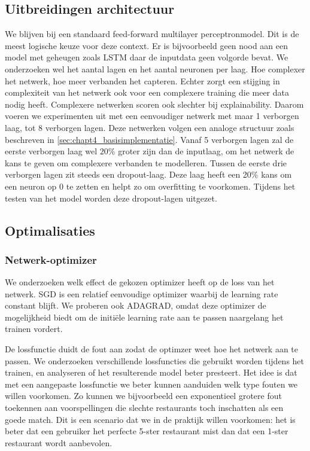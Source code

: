 \subsection{Uitbreidingen architectuur}
We blijven bij een standaard feed-forward multilayer perceptronmodel. Dit is de meest logische keuze voor deze context. Er is bijvoorbeeld geen nood aan een model met geheugen zoals LSTM daar de inputdata geen volgorde bevat. 
We onderzoeken wel het aantal lagen en het aantal neuronen per laag. Hoe complexer het netwerk, hoe meer verbanden het capteren. Echter zorgt een stijging in complexiteit van het netwerk ook voor een complexere training die meer data nodig heeft. Complexere netwerken scoren ook slechter bij explainability. Daarom voeren we experimenten uit met een eenvoudiger netwerk met maar 1 verborgen laag, tot 8 verborgen lagen. Deze netwerken volgen een analoge structuur zoals beschreven in \autoref{sec:chapt4_basisimplementatie}. Vanaf 5 verborgen lagen zal de eerste verborgen laag wel $20$\% groter zijn dan de inputlaag, om het netwerk de kans te geven om complexere verbanden te modelleren. Tussen de eerste drie verborgen lagen zit steeds een dropout-laag. Deze laag heeft een 20\% kans om een neuron op 0 te zetten en helpt zo om overfitting te voorkomen. \cite{nn_dropout} Tijdens het testen van het model worden deze dropout-lagen uitgezet.

\subsection{Optimalisaties}
\subsubsection{Netwerk-optimizer}
We onderzoeken welk effect de gekozen optimizer heeft op de loss van het netwerk. SGD is een relatief eenvoudige optimizer waarbij de learning rate constant blijft. We proberen ook ADAGRAD, omdat deze optimizer de mogelijkheid biedt om de initiële learning rate aan te passen naargelang het trainen vordert.

De lossfunctie duidt de fout aan zodat de optimzer weet hoe het netwerk aan te passen. We onderzoeken verschillende lossfuncties die gebruikt worden tijdens het trainen, en analyseren of het resulterende model beter presteert. Het idee is dat met een aangepaste lossfunctie we beter kunnen aanduiden welk type fouten we willen voorkomen. Zo kunnen we bijvoorbeeld een exponentieel grotere fout toekennen aan voorspellingen die slechte restaurants toch inschatten als een goede match. Dit is een scenario dat we in de praktijk willen voorkomen: het is beter dat een gebruiker het perfecte 5-ster restaurant mist dan dat een 1-ster restaurant wordt aanbevolen.

